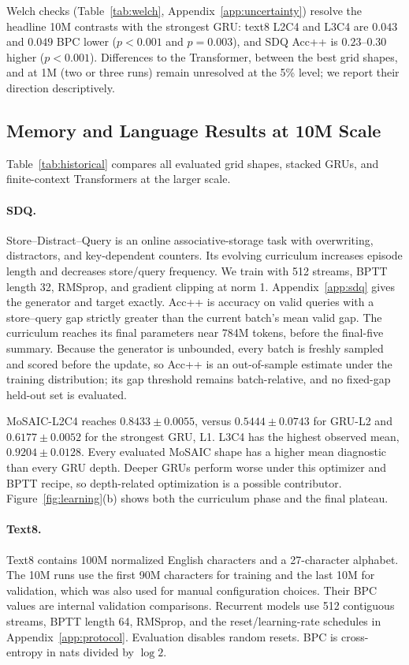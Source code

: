 \documentclass[letterpaper,twoside]{article}
\begin{document}
Welch checks (Table~\ref{tab:welch}, Appendix~\ref{app:uncertainty}) resolve the headline 10M contrasts with the strongest GRU: text8 L2C4 and L3C4 are $0.043$ and $0.049$ BPC lower ($p<0.001$ and $p=0.003$), and SDQ Acc++ is $0.23$--$0.30$ higher ($p<0.001$). Differences to the Transformer, between the best grid shapes, and at 1M (two or three runs) remain unresolved at the 5\% level; we report their direction descriptively.



\subsection{Memory and Language Results at 10M Scale}

Table~\ref{tab:historical} compares all evaluated grid shapes, stacked GRUs, and finite-context Transformers at the larger scale.

\paragraph{SDQ.}
Store--Distract--Query is an online associative-storage task with overwriting, distractors, and key-dependent counters. Its evolving curriculum increases episode length and decreases store/query frequency. We train with 512 streams, BPTT length 32, RMSprop, and gradient clipping at norm 1. Appendix~\ref{app:sdq} gives the generator and target exactly. Acc++ is accuracy on valid queries with a store--query gap strictly greater than the current batch's mean valid gap. The curriculum reaches its final parameters near 784M tokens, before the final-five summary. Because the generator is unbounded, every batch is freshly sampled and scored before the update, so Acc++ is an out-of-sample estimate under the training distribution; its gap threshold remains batch-relative, and no fixed-gap held-out set is evaluated.

MoSAIC-L2C4 reaches $0.8433\pm0.0055$, versus $0.5444\pm0.0743$ for GRU-L2 and $0.6177\pm0.0052$ for the strongest GRU, L1. L3C4 has the highest observed mean, $0.9204\pm0.0128$. Every evaluated MoSAIC shape has a higher mean diagnostic than every GRU depth. Deeper GRUs perform worse under this optimizer and BPTT recipe, so depth-related optimization is a possible contributor. Figure~\ref{fig:learning}(b) shows both the curriculum phase and the final plateau.

\paragraph{Text8.}
Text8 \citep{mahoney2011text8} contains 100M normalized English characters and a 27-character alphabet. The 10M runs use the first 90M characters for training and the last 10M for validation, which was also used for manual configuration choices. Their BPC values are internal validation comparisons. Recurrent models use 512 contiguous streams, BPTT length 64, RMSprop, and the reset/learning-rate schedules in Appendix~\ref{app:protocol}. Evaluation disables random resets. BPC is cross-entropy in nats divided by $\log 2$.
\end{document}
